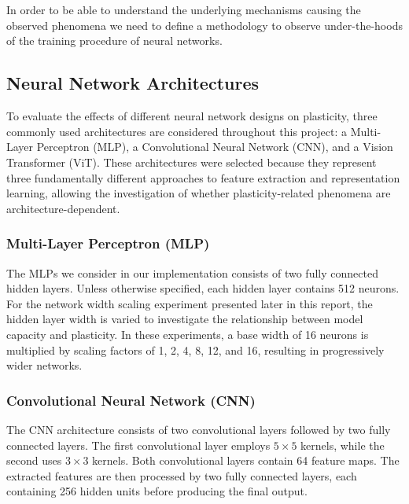 \section{}
\label{sec:methodology}

In order to be able to understand the underlying mechanisms causing the observed phenomena we need to define a methodology to observe under-the-hoods of the training procedure of neural networks.

\subsection{Neural Network Architectures}

To evaluate the effects of different neural network designs on plasticity, three commonly used architectures are considered throughout this project: a Multi-Layer Perceptron (MLP), a Convolutional Neural Network (CNN), and a Vision Transformer (ViT). These architectures were selected because they represent three fundamentally different approaches to feature extraction and representation learning, allowing the investigation of whether plasticity-related phenomena are architecture-dependent.

\subsubsection{Multi-Layer Perceptron (MLP)}

The MLPs we consider in our implementation consists of two fully connected hidden layers. Unless otherwise specified, each hidden layer contains 512 neurons. For the network width scaling experiment presented later in this report, the hidden layer width is varied to investigate the relationship between model capacity and plasticity. In these experiments, a base width of 16 neurons is multiplied by scaling factors of 1, 2, 4, 8, 12, and 16, resulting in progressively wider networks.

\subsubsection{Convolutional Neural Network (CNN)}

The CNN architecture consists of two convolutional layers followed by two fully connected layers. The first convolutional layer employs $5 \times 5$ kernels, while the second uses $3 \times 3$ kernels. Both convolutional layers contain 64 feature maps. The extracted features are then processed by two fully connected layers, each containing 256 hidden units before producing the final output.

